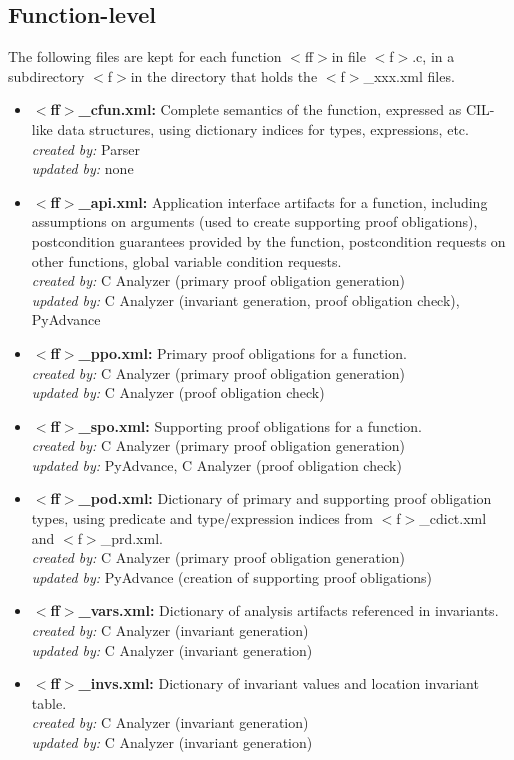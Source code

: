 \documentclass[11pt]{article}
\newcommand\fname{$<$f$>$}
\newcommand\fnname{$<$ff$>$}
\begin{document}
\subsection{Function-level}

The following files are kept for each function \fnname in file \fname.c, 
in a subdirectory \fname in the directory that holds the \fname\_xxx.xml
files.

\begin{itemize}[leftmargin=*]
\item {\bf \fnname\_cfun.xml:} Complete semantics of the function, expressed
   as CIL-like data structures, using dictionary indices for types, expressions,
   etc.\\
   \emph{created by:} Parser \\
   \emph{updated by:} none
\item {\bf \fnname\_api.xml:} Application interface artifacts for a function,
  including assumptions on arguments (used to create supporting proof obligations),
  postcondition guarantees provided by the function, postcondition requests on
  other functions, global variable condition requests.\\
  \emph{created by:} C Analyzer (primary proof obligation generation) \\
  \emph{updated by:} C Analyzer (invariant generation, proof obligation check), PyAdvance
\item {\bf \fnname\_ppo.xml:} Primary proof obligations for a function. \\
  \emph{created by:} C Analyzer (primary proof obligation generation) \\
  \emph{updated by:} C Analyzer (proof obligation check)
\item {\bf \fnname\_spo.xml:} Supporting proof obligations for a function. \\
  \emph{created by:} C Analyzer (primary proof obligation generation) \\
  \emph{updated by:} PyAdvance, C Analyzer (proof obligation check)
\item {\bf \fnname\_pod.xml:} Dictionary of primary and supporting proof obligation
   types, using predicate and type/expression indices from \fname\_cdict.xml and
   \fname\_prd.xml. \\
   \emph{created by:} C Analyzer (primary proof obligation generation) \\
   \emph{updated by:} PyAdvance (creation of supporting proof obligations)
\item {\bf \fnname\_vars.xml:} Dictionary of analysis artifacts referenced in invariants.\\
   \emph{created by:} C Analyzer (invariant generation) \\
   \emph{updated by:} C Analyzer (invariant generation)
\item {\bf \fnname\_invs.xml:} Dictionary of invariant values and location invariant table.\\
   \emph{created by:} C Analyzer (invariant generation) \\
   \emph{updated by:} C Analyzer (invariant generation)
\end{itemize}
\end{document}
